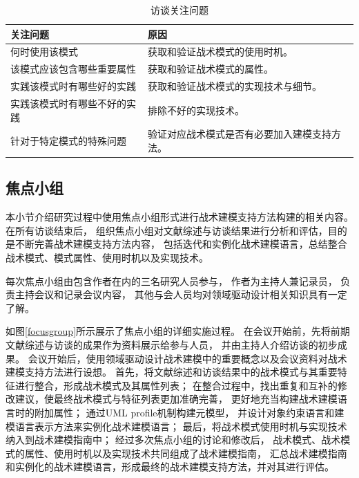 {\footnotesize
\begin{longtable}[h]{m{170pt}|m{215pt}}
    \caption[访谈关注问题]{访谈关注问题} \label{reviewQ} \\
        \hline  
        关注问题&原因\\
        \hline
        何时使用该模式&获取和验证战术模式的使用时机。\\
        \hline
        该模式应该包含哪些重要属性&获取和验证战术模式的属性。\\
        \hline
        实践该模式时有哪些好的实践&获取和验证战术模式的实现技术与细节。\\
        \hline
        实践该模式时有哪些不好的实践&排除不好的实现技术。\\
        \hline
        针对于特定模式的特殊问题&验证对应战术模式是否有必要加入建模支持方法。\\
        \hline
    \end{longtable}
}



\subsection{焦点小组}

本小节介绍研究过程中使用焦点小组形式进行战术建模支持方法构建的相关内容。在所有访谈结束后，
组织焦点小组对文献综述与访谈结果进行分析和评估，目的是不断完善战术建模支持方法内容，
包括迭代和实例化战术建模语言，总结整合战术模式、模式属性、使用时机以及实现技术。

每次焦点小组由包含作者在内的三名研究人员参与，
作者为主持人兼记录员，
负责主持会议和记录会议内容，
其他与会人员均对领域驱动设计相关知识具有一定了解。

如图\ref{focusgroup}所示展示了焦点小组的详细实施过程。
在会议开始前，先将前期文献综述与访谈的成果作为资料展示给参与人员，
并由主持人介绍访谈的初步成果。
会议开始后，使用领域驱动设计战术建模中的重要概念以及会议资料对战术建模支持方法进行设想。
首先，将文献综述和访谈结果中的战术模式与其重要特征进行整合，形成战术模式及其属性列表；
在整合过程中，找出重复和互补的修改建议，使最终战术模式与特征列表更加准确完善，
更好地充当构建战术建模语言时的附加属性；
通过UML profile机制构建元模型，
并设计对象约束语言和建模语言表示方法来实例化战术建模语言；
最后，将战术模式使用时机与实现技术纳入到战术建模指南中；
经过多次焦点小组的讨论和修改后，
战术模式、战术模式的属性、使用时机以及实现技术共同组成了战术建模指南，
汇总战术建模指南和实例化的战术建模语言，形成最终的战术建模支持方法，并对其进行评估。



